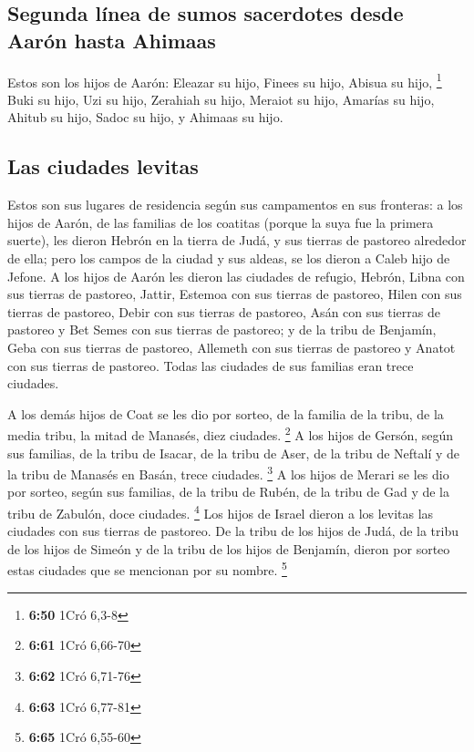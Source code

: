 \begin{paracol}{2}
{\subsection{Segunda línea de sumos sacerdotes desde Aarón hasta
Ahimaas}\label{segunda-luxednea-de-sumos-sacerdotes-desde-aaruxf3n-hasta-ahimaas}}

 Estos son los hijos de Aarón: Eleazar su hijo, Finees su
hijo, Abisua su hijo, \footnote{\textbf{6:50} 1Cró 6,3-8}
 Buki su hijo, Uzi su hijo, Zerahiah su hijo,
 Meraiot su hijo, Amarías su hijo, Ahitub su hijo,
 Sadoc su hijo, y Ahimaas su hijo.

\hypertarget{las-ciudades-levitas}{%
\subsection{Las ciudades levitas}\label{las-ciudades-levitas}}

 Estos son sus lugares de residencia según sus
campamentos en sus fronteras: a los hijos de Aarón, de las familias de
los coatitas (porque la suya fue la primera suerte),  les
dieron Hebrón en la tierra de Judá, y sus tierras de pastoreo alrededor
de ella;  pero los campos de la ciudad y sus aldeas, se
los dieron a Caleb hijo de Jefone.  A los hijos de Aarón
les dieron las ciudades de refugio, Hebrón, Libna con sus tierras de
pastoreo, Jattir, Estemoa con sus tierras de pastoreo, 
Hilen con sus tierras de pastoreo, Debir con sus tierras de pastoreo,
 Asán con sus tierras de pastoreo y Bet Semes con sus
tierras de pastoreo;  y de la tribu de Benjamín, Geba con
sus tierras de pastoreo, Allemeth con sus tierras de pastoreo y Anatot
con sus tierras de pastoreo. Todas las ciudades de sus familias eran
trece ciudades.

 A los demás hijos de Coat se les dio por sorteo, de la
familia de la tribu, de la media tribu, la mitad de Manasés, diez
ciudades. \footnote{\textbf{6:61} 1Cró 6,66-70}  A los
hijos de Gersón, según sus familias, de la tribu de Isacar, de la tribu
de Aser, de la tribu de Neftalí y de la tribu de Manasés en Basán, trece
ciudades. \footnote{\textbf{6:62} 1Cró 6,71-76}  A los
hijos de Merari se les dio por sorteo, según sus familias, de la tribu
de Rubén, de la tribu de Gad y de la tribu de Zabulón, doce ciudades.
\footnote{\textbf{6:63} 1Cró 6,77-81}  Los hijos de
Israel dieron a los levitas las ciudades con sus tierras de pastoreo.
 De la tribu de los hijos de Judá, de la tribu de los
hijos de Simeón y de la tribu de los hijos de Benjamín, dieron por
sorteo estas ciudades que se mencionan por su nombre. \footnote{\textbf{6:65}
  1Cró 6,55-60}


\end{paracol}
